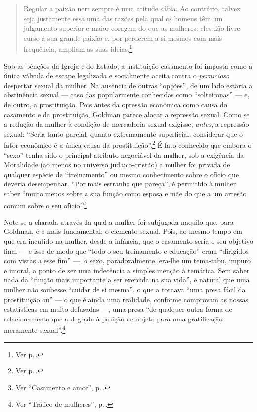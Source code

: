 \begin{quote}
Regular a paixão nem sempre é uma atitude sábia. Ao contrário, talvez
seja justamente essa uma das razões pela qual os homens têm um
julgamento superior e maior coragem do que as mulheres: eles dão livre
curso à sua grande paixão e, por perderem a si mesmos com mais
frequência, ampliam as suas ideias.\footnote{Ver p.\,\pageref{regular}.}
\end{quote}

Sob as bênçãos da Igreja e do Estado, a instituição casamento foi
imposta como a única válvula de escape legalizada e socialmente aceita
contra o \emph{pernicioso} despertar sexual da mulher. Na ausência de
outras ``opções'', de um lado estaria a abstinência sexual --- caso
das popularmente conhecidas como ``solteironas'' --- e, de outro, a
prostituição. Pois antes da opressão econômica como causa do casamento e
da prostituição, Goldman parece alocar a repressão sexual. Como se a
redução da mulher à condição de mercadoria sexual exigisse,
\emph{antes}, a repressão sexual: ``Seria tanto parcial, quanto
extremamente superficial, considerar que o fator econômico é a única
causa da prostituição''.\footnote{Ver p.\,\pageref{parcial}.}
É fato conhecido que embora o ``sexo'' tenha
sido o principal atributo negociável da mulher, sob a
exigência da Moralidade (ao menos no universo
judaico-cristão) a mulher foi privada de qualquer espécie de
``treinamento'' ou mesmo conhecimento sobre o ofício que
deveria desempenhar. ``Por mais estranho que pareça'',
é permitido à mulher saber ``muito
menos sobre a sua função como esposa e mãe do que a um artesão comum
sobre o seu ofício.''\footnote{Ver ``Casamento e amor'', p.\,\pageref{artesao}.}

Note-se a charada através da qual a mulher
foi subjugada naquilo que, para Goldman, é o mais fundamental: o elemento
sexual. Pois, ao mesmo tempo em que era incutido na mulher, desde a
infância, que o casamento seria o seu objetivo final --- e isso de modo
que ``todo o seu treinamento e educação'' eram ``dirigidos com vistas a
esse fim'' ---, o sexo, paradoxalmente, era-lhe um tema-tabu, impuro e
imoral, a ponto de ser uma indecência a simples menção à temática. Sem
saber nada da ``função mais importante a ser exercida na sua vida'',
é natural que uma mulher não soubesse ``cuidar de si mesma'', o que a tornava ``uma presa
fácil da prostituição ou'' --- o que é ainda uma realidade, conforme
comprovam as nossas estatísticas em muito defasadas ---, uma presa ``de
qualquer outra forma de relacionamento que a degrade à posição de
objeto para uma gratificação meramente sexual''.\footnote{Ver ``Tráfico de mulheres'', p.\,\pageref{objeto}.}

